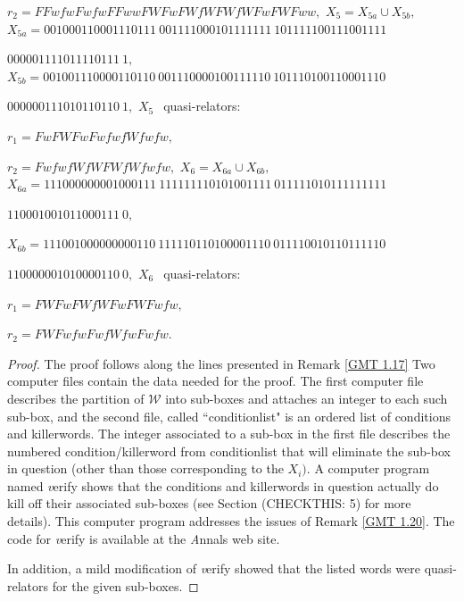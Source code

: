 \begin{remark}
\begin{proposition}
$r_2 = FFwfwFwfwFFwwFWFwFWfWFWfWFwFWFww,$
\noindent $X_5 = X_{5a} \cup X_{5b},$
\noindent $X_{5a} = 
001000110001110111\ 
001111000101111111\ 
101111100111001111$\hfill

\hfill 
$000001111011110111\ 1,$
\noindent  $X_{5b} = 
001001110000110110\ 
001110000100111110\ 
101110100110001110$\hfill

\hfill  
$000000111010110110\ 1,$
\noindent $X_5\ \ $ quasi\/{\textrm -}\/relators\/{\textrm :}

$r_1 = FwFWFwFwfwfWfwfw,$

$r_2 = FwfwfWfWFWfWfwfw,$
\vfil
\noindent $X_6 = X_{6a} \cup X_{6b},$
\vfil
\noindent $X_{6a} = 
111000000001000111\ 
111111110101001111\ 
011111010111111111$\hfill

\hfill  
$110001001011000111\ 0,$
\vglue4pt

\noindent $X_{6b} = 
111001000000000110\ 
111110110100001110\ 
011110010110111110$\hfill

\hfill  
$110000001010000110\ 0,$
\noindent $X_6\ \ $ quasi\/{\textrm -}\/relators\/{\textrm :}\/

$r_1 = FWFwFWfWFwFWFwfw,$

$r_2 = FWFwfwFwfWfwFwfw.$
\end{proposition}

 
\begin{proof}{}  
The proof follows along the lines presented in
Remark \ref{GMT 1.17}
Two computer files contain the data needed for the proof.   
The first computer file describes the partition of ${\mathcal W}$ into
sub-boxes and attaches an integer to each such sub-box, 
and the second file, called ``conditionlist" is an ordered list of conditions and killerwords.
The integer associated to a sub-box in the first file describes the numbered condition/killerword from   conditionlist that will eliminate the sub-box
in question (other than those corresponding to the $X_i).$ A computer program named {\textit verify} shows
that the conditions and killerwords in question actually do kill off their associated sub-boxes (see
	Section (CHECKTHIS: 5)  %
	for more details).  This computer
program addresses the issues of Remark \ref{GMT 1.20}.  The code for {\textit
verify} is available at the {\textit Annals} web site. 

In addition, a mild modification of {\textit verify} showed that the listed words were quasi-relators for the given sub-boxes. 
\end{proof}


\end{remark}
